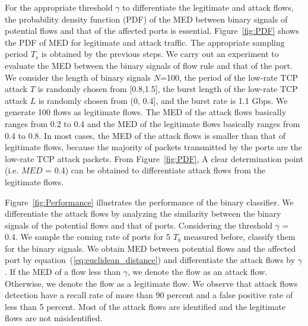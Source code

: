\documentclass[conference]{IEEEtran}
\begin{document}
For the appropriate threshold $\gamma$ to differentiate the legitimate and attack flows, the probability density function (PDF) of the MED between binary signals of potential flows and that of the affected ports is essential. Figure~\ref{fig:PDF} shows the PDF of MED for legitimate and attack traffic. The appropriate sampling period $T_s$ is obtained by the previous steps. We carry out an experiment to evaluate the MED between the binary signals of flow rule and that of the port. 
We consider the length of binary signals $N$=100, the period of the low-rate TCP attack $T$ is randomly chosen from [0.8,1.5], the burst length of the low-rate TCP attack $L$ is randomly chosen from (0, 0.4], and the burst rate is 1.1 Gbps. We generate 100 flows as legitimate flows. The MED of the attack flows basically ranges from 0.2 to 0.4 and the MED of the legitimate flows basically ranges from 0.4 to 0.8. In most cases, the MED of the attack flows is smaller than that of legitimate flows, because the majority of packets transmitted by the ports are the low-rate TCP attack packets. From Figure~\ref{fig:PDF}, A clear determination point (i.e. $MED$ = 0.4) can be obtained to differentiate attack flows from the legitimate flows.


Figure~\ref{fig:Performance} illustrates the performance of the binary classifier. We differentiate the attack flows by analyzing the similarity between the binary signals of the potential flows and that of ports. Considering the threshold $\gamma$ = 0.4. We sample the coming rate of ports for 5 $T_b$ measured before, classify them for the binary signals. We obtain MED between potential flows and the affected port by equation~(\ref{eq:euclidean_distance}) and differentiate the attack flows by $\gamma$. If the MED of a flow less than $\gamma$, we denote the flow as an attack flow. Otherwise, we denote the flow as a legitimate flow. We observe that attack flows detection have a recall rate of more than 90 percent and a false positive rate of less than 5 percent. Most of the attack flows are identified and the legitimate flows are not misidentified.
\end{document}
